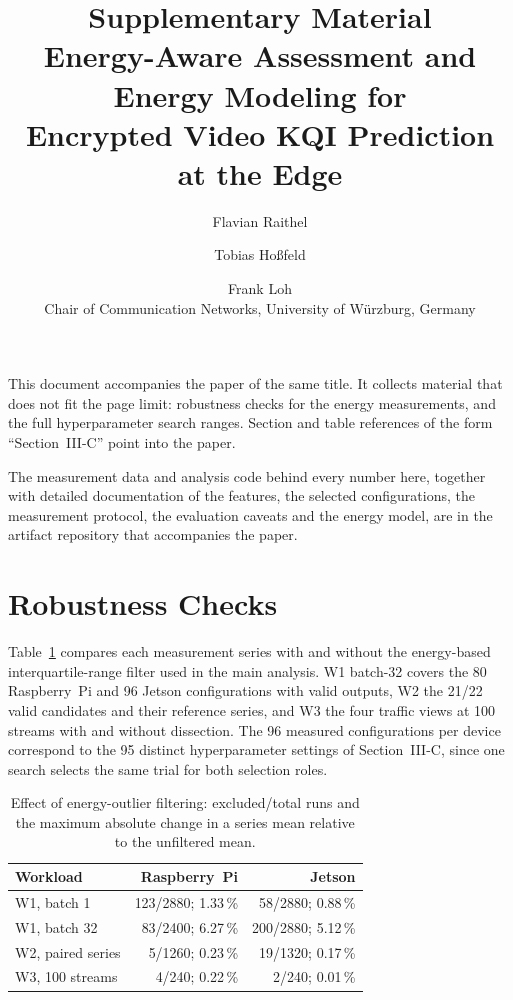 \documentclass[10pt,a4paper]{article}
\title{Supplementary Material\\[2mm]
\large Energy-Aware Assessment and Energy Modeling for\\Encrypted Video KQI Prediction at the Edge}
\author{Flavian Raithel \and Tobias Ho{\ss}feld \and Frank Loh\\[1mm]
\normalsize Chair of Communication Networks, University of W{\"u}rzburg, Germany}
\date{}
\newcommand{\rpi}{Raspberry~Pi}
\newcommand{\jn}{Jetson}
\begin{document}
\maketitle

\noindent
This document accompanies the paper of the same title. It collects material that does not fit
the page limit: robustness checks for the energy measurements, and the full hyperparameter
search ranges. Section and table references of the form ``Section~III-C'' point into the paper.

The measurement data and analysis code behind every number here, together with detailed
documentation of the features, the selected configurations, the measurement protocol, the
evaluation caveats and the energy model, are in the artifact repository that accompanies the
paper.

\section{Robustness Checks}\label{app:robustness}

Table~\ref{tab:retention} compares each measurement series with and without the energy-based
interquartile-range filter used in the main analysis. W1 batch-32 covers the 80 \rpi{} and 96
\jn{} configurations with valid outputs, W2 the 21/22 valid candidates and their reference
series, and W3 the four traffic views at 100 streams with and without dissection. The 96
measured configurations per device correspond to the 95 distinct hyperparameter settings of
Section~III-C, since one search selects the same trial for both selection roles.

\begin{table}[H]
\centering
\caption{Effect of energy-outlier filtering: excluded/total runs and the maximum absolute change
in a series mean relative to the unfiltered mean.}
\label{tab:retention}
\footnotesize
\setlength{\tabcolsep}{6pt}
\begin{tabular}{@{}lrr@{}}
\toprule
Workload & \rpi{} & \jn{} \\
\midrule
W1, batch 1 & 123/2880; 1.33\,\% & 58/2880; 0.88\,\% \\
W1, batch 32 & 83/2400; 6.27\,\% & 200/2880; 5.12\,\% \\
W2, paired series & 5/1260; 0.23\,\% & 19/1320; 0.17\,\% \\
W3, 100 streams & 4/240; 0.22\,\% & 2/240; 0.01\,\% \\
\bottomrule
\end{tabular}
\end{table}
\end{document}
